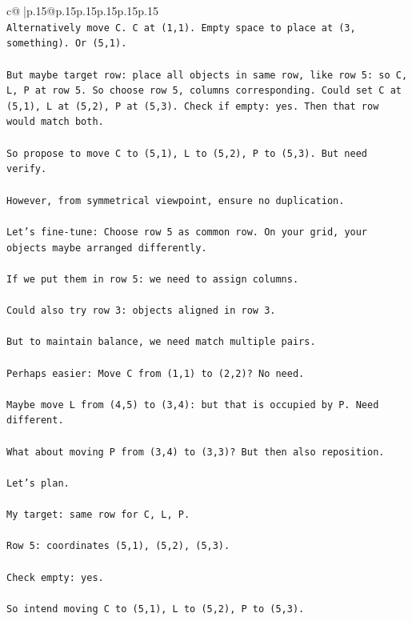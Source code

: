 \documentclass{article}
\begin{document}
{\begin{supertabular}{c@{$\;$}|p{.15\linewidth}@{}p{.15\linewidth}p{.15\linewidth}p{.15\linewidth}p{.15\linewidth}p{.15\linewidth}}
{{{\\ 
\texttt{Alternatively move C. C at (1,1). Empty space to place at (3, something). Or (5,1).} \\
\\ 
\texttt{But maybe target row: place all objects in same row, like row 5: so C, L, P at row 5. So choose row 5, columns corresponding. Could set C at (5,1), L at (5,2), P at (5,3). Check if empty: yes. Then that row would match both.} \\
\\ 
\texttt{So propose to move C to (5,1), L to (5,2), P to (5,3). But need verify.} \\
\\ 
\texttt{However, from symmetrical viewpoint, ensure no duplication.} \\
\\ 
\texttt{Let's fine{-}tune: Choose row 5 as common row. On your grid, your objects maybe arranged differently.} \\
\\ 
\texttt{If we put them in row 5: we need to assign columns.} \\
\\ 
\texttt{Could also try row 3: objects aligned in row 3.} \\
\\ 
\texttt{But to maintain balance, we need match multiple pairs.} \\
\\ 
\texttt{Perhaps easier: Move C from (1,1) to (2,2)? No need.} \\
\\ 
\texttt{Maybe move L from (4,5) to (3,4): but that is occupied by P. Need different.} \\
\\ 
\texttt{What about moving P from (3,4) to (3,3)? But then also reposition.} \\
\\ 
\texttt{Let's plan.} \\
\\ 
\texttt{My target: same row for C, L, P.} \\
\\ 
\texttt{Row 5: coordinates (5,1), (5,2), (5,3).} \\
\\ 
\texttt{Check empty: yes.} \\
\\ 
\texttt{So intend moving C to (5,1), L to (5,2), P to (5,3).} \\
\\ 
}}}
\end{supertabular}}
\end{document}
